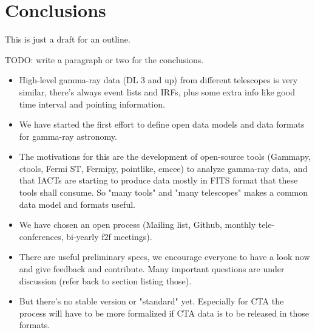 \section{Conclusions}

This is just a draft for an outline.

TODO: write a paragraph or two for the conclusions.

\begin{itemize}
\item High-level gamma-ray data (DL 3 and up) from different telescopes is very similar, there's always event lists and IRFs, plus some extra info like good time interval and pointing information.
\item We have started the first effort to define open data models and data formats for gamma-ray astronomy.
\item The motivations for this are the development of open-source tools
(Gammapy, ctools, Fermi ST, Fermipy, pointlike, emcee) to analyze gamma-ray data, and that IACTs are starting to produce data mostly in FITS format that these tools shall consume. So "many tools" and "many telescopes" makes a common data model and formats useful.
\item We have chosen an open process (Mailing list, Github, monthly tele-conferences, bi-yearly f2f meetings).
\item There are useful preliminary specs, we encourage everyone to have a look now and give feedback and contribute. Many important questions are under discussion (refer back to section listing those).
\item But there's no stable version or "standard" yet. Especially for CTA the process will have to be more formalized if CTA data is to be released in those formats.
\end{itemize}
